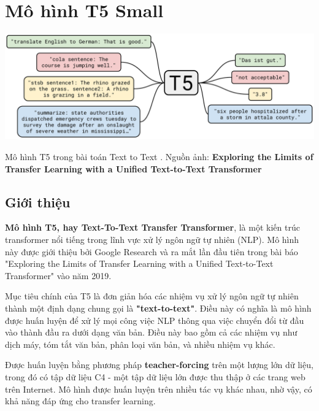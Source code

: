 \documentclass[a4paper, 10pt]{article}
\begin{document}
\section{Mô hình T5 Small}
\begin{minipage}{\linewidth}
    \captionsetup{type=figure}
    \centering
    \includegraphics[width=14cm]{./t5.jpg}
    \caption{Mô hình T5 trong bài toán Text to Text . Nguồn ảnh: \textbf{Exploring the Limits of Transfer Learning with a Unified Text-to-Text Transformer}}
\end{minipage}

\vspace{0.5cm}
\subsection{Giới thiệu}
\textbf{Mô hình T5, hay Text-To-Text Transfer Transformer}, là một kiến trúc transformer nổi tiếng trong lĩnh vực xử lý ngôn ngữ tự nhiên (NLP). Mô hình này được giới thiệu 
bởi Google Research và ra mắt lần đầu tiên trong bài báo 
"Exploring the Limits of Transfer Learning with a Unified Text-to-Text Transformer" vào năm 2019.

Mục tiêu chính của T5 là đơn giản hóa các nhiệm vụ xử lý ngôn ngữ tự nhiên thành một định dạng chung gọi là \textbf{"text-to-text"}. Điều này có nghĩa là mô hình được huấn luyện để xử lý mọi công việc NLP thông qua việc chuyển đổi từ đầu vào thành đầu ra dưới dạng văn bản. Điều này bao gồm cả các nhiệm vụ như dịch máy, 
tóm tắt văn bản, phân loại văn bản, và nhiều nhiệm vụ khác.

Được huấn luyện bằng phương pháp \textbf{teacher-forcing} trên một lượng lớn dữ liệu, trong đó có tập dữ liệu C4 - một tập dữ liệu lớn được thu thập ở các trang web trên Internet. 
Mô hình được huấn luyện trên nhiều tác vụ khác nhau, nhờ vậy, có khả năng đáp ứng cho transfer learning.
\end{document}
